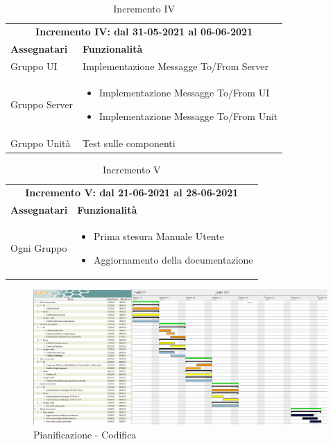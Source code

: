 \begin{table} [h!]
	\begin{center}
		\begin{tabular} { m{4cm}  m{11cm}  }	
			\multicolumn{2}{c}{	\textbf{Incremento IV: dal 31-05-2021 al 06-06-2021}} \\
			\rowcolor{lightgray}
			\textbf{Assegnatari} & \textbf{Funzionalità} \\
			Gruppo UI & Implementazione Messagge To/From Server\\	
			Gruppo Server & \begin{itemize}
				\item Implementazione Messagge To/From UI
				\item Implementazione Messagge To/From Unit
			\end{itemize}\\		
			Gruppo Unità & Test sulle componenti\\
			
		\end{tabular}
		\caption{Incremento IV}
	\end{center}
\end{table}

\begin{table} [h!]
	\begin{center}
		\begin{tabular} { m{4cm}  m{11cm}  }	
			\multicolumn{2}{c}{	\textbf{Incremento V: dal 21-06-2021 al 28-06-2021}} \\
			\rowcolor{lightgray}
			\textbf{Assegnatari} & \textbf{Funzionalità} \\
				Ogni Gruppo & \begin{itemize}
				\item Prima stesura Manuale Utente
				\item Aggiornamento della documentazione
			\end{itemize}\\		
			
		\end{tabular}
		\caption{Incremento V}
	\end{center}
\end{table}

\newpage
\begin{landscape}
	\begin{figure}[h!]
		\includegraphics[width=24cm]{images/6_incrementi}
		\caption{Pianificazione - Codifica }
	\end{figure}
\end{landscape}

